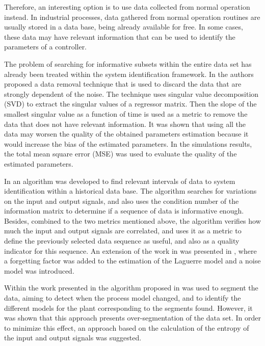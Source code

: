\documentclass[letterpaper, 10 pt, conference]{ieeeconf}  %
\begin{document}
Therefore, an interesting option is to use data collected from normal operation instead.
In industrial processes, data gathered from normal operation routines are usually stored in a data base, being already available for free.
In some cases, these data may have relevant information that can be used to identify the parameters of a controller.


The problem of searching for informative subsets within the entire data set has already been treated within the system identification framework.
In \cite{carrette1996discarding} the authors proposed a data removal technique that is used to discard the data that are strongly dependent of the noise.
The technique uses singular value decomposition (SVD) to extract the singular values of a regressor matrix.
Then the slope of the smallest singular value as a function of time is used as a metric to remove the data that does not have relevant information.
It was shown that using all the data may worsen the quality of the obtained parameters estimation because it would increase the bias of the estimated parameters.
In the simulations results, the total mean square error (MSE) was used to evaluate the quality of the estimated parameters.

In \cite{peretzki2011data} an algorithm was developed to find relevant intervals of data to system identification within a historical data base.
The algorithm searches for variations on the input and output signals, and also uses the condition number of the information matrix to determine if a sequence of data is informative enough.
Besides, combined to the two metrics mentioned above, the algorithm verifies how much the input and output signals are correlated, and uses it as a metric to define the previously selected data sequence as useful, and also as a quality indicator for this sequence.
An extension of the work in \cite{peretzki2011data} was presented in \cite{bittencourt2015algorithm}, where a forgetting factor was added to the estimation of the Laguerre model and a noise model was introduced.

Within the work presented in \cite{shardt2014segmentation} the algorithm proposed in \cite{peretzki2011data} was used to segment the data, aiming to detect when the process model changed, and to identify the different models for the plant corresponding to the segments found.
However, it was shown that this approach presents over-segmentation of the data set.
In order to minimize this effect, an approach based on the calculation of the entropy of the input and output signals was suggested.
\end{document}

